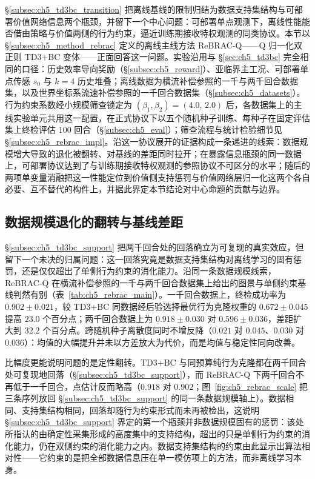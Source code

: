 \S\ref{subsec:ch5_td3bc_transition} 把离线基线的限制归结为数据支持集结构与可部署价值网络信息两个瓶颈，并留下一个中心问题：可部署单点观测下，离线性能能否借由策略与价值两侧的行为约束，逼近训练期接收特权观测的同类协议。本节以 \S\ref{subsec:ch5_method_rebrac} 定义的离线主线方法 ReBRAC-Q——Q 归一化双正则 TD3+BC 变体——正面回答这一问题。实验沿用与 \S\ref{sec:ch5_td3bc} 完全相同的口径：历史效率导向奖励（\S\ref{subsec:ch5_reward}）、亚临界主工况、可部署单点传感 $s_0$ 与 $k=4$ 历史堆叠；离线数据为横流补偿参照的一千与两千回合数据集，以及世界坐标系流速补偿参照的一千回合数据集（\S\ref{subsec:ch5_datasets}）。行为约束系数经小规模筛查锁定为 $(\beta_1,\beta_2)=(4.0,\,2.0)$ 后，各数据集上的主线实验单元共用这一配置，在正式协议下以五个随机种子训练、每种子在固定评估集上终检评估 $100$ 回合（\S\ref{subsec:ch5_eval}）；筛查流程与统计检验细节见 \S\ref{subsec:ch5_rebrac_impl}。沿这一协议展开的证据构成一条递进的线索：数据规模增大导致的退化被翻转、对基线的差距同时拉开；在暴露信息瓶颈的同一数据上，可部署协议达到了与训练期接收特权观测的参照协议不可区分的水平；随后的两项单变量消融把这一性能定位到价值侧支持惩罚与价值网络层归一化这两个各自必要、互不替代的构件上，并据此界定本节结论对中心命题的贡献与边界。

\subsection{数据规模退化的翻转与基线差距}\label{subsec:ch5_rebrac_scale}

\S\ref{subsec:ch5_td3bc_support} 把两千回合处的回落确立为可复现的真实效应，但留下一个未决的归属问题：这一回落究竟是数据支持集结构对离线学习的固有惩罚，还是仅仅超出了单侧行为约束的消化能力。沿同一条数据规模线索，ReBRAC-Q 在横流补偿参照的一千与两千回合数据集上给出的图景与单侧约束基线判然有别（表~\ref{tab:ch5_rebrac_main}）。一千回合数据上，终检成功率为 $0.902 \pm 0.021$，较 TD3+BC 同数据经后验选择最优行为克隆权重的 $0.672 \pm 0.045$ 提高 $23.0$ 个百分点；两千回合数据上为 $0.918 \pm 0.030$ 对 $0.596 \pm 0.036$，差距扩大到 $32.2$ 个百分点。跨随机种子离散度同时不增反降（$0.021$ 对 $0.045$、$0.030$ 对 $0.036$）：均值的大幅提升并未以方差放大为代价，而是均值与稳定性同向改善。

比幅度更能说明问题的是定性翻转。TD3+BC 与同预算纯行为克隆都在两千回合处可复现地回落（\S\ref{subsec:ch5_td3bc_support}），而 ReBRAC-Q 下两千回合不再低于一千回合，点估计反而略高（$0.918$ 对 $0.902$；图~\ref{fig:ch5_rebrac_scale} 把三条序列放回 \S\ref{subsec:ch5_td3bc_support} 的同一条数据规模轴上）。数据相同、支持集结构相同，回落却随行为约束形式而未再被检出，这说明 \S\ref{subsec:ch5_td3bc_support} 界定的第一个瓶颈并非数据规模固有的惩罚：该处所指认的由确定性采集形成的高度集中的支持结构，超出的只是单侧行为约束的消化能力，仍在双侧约束的消化能力之内。数据支持集结构的约束由此显示出算法相对性——它约束的是把全部数据信息压在单一模仿项上的方法，而非离线学习本身。

